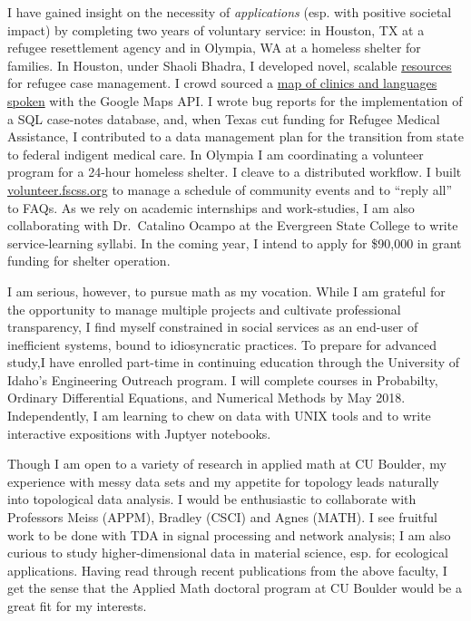 I have gained insight on the necessity of \emph{applications} (esp. with
positive societal impact) by completing two years of voluntary service:
in Houston, TX at a refugee resettlement agency and in Olympia, WA at a
homeless shelter for families. In Houston, under Shaoli Bhadra, I
developed novel, scalable
\href{https://github.com/coltongrainger/ymca-resources}{resources} for
refugee case management. I crowd sourced a
\href{https://drive.google.com/open?id=1kk9yn6-4nifHLIf2tGYbW_7PiYo\&usp=sharing}{map
of clinics and languages spoken} with the Google Maps API. I wrote bug
reports for the implementation of a SQL case-notes database, and, when
Texas cut funding for Refugee Medical Assistance, I contributed to a
data management plan for the transition from state to federal indigent
medical care. In Olympia I am coordinating a volunteer program for a
24-hour homeless shelter. I cleave to a distributed workflow. I built
\href{https://volunteer.fscss.org}{volunteer.fscss.org} to manage a
schedule of community events and to ``reply all'' to FAQs. As we rely on
academic internships and work-studies, I am also collaborating with
Dr.~Catalino Ocampo at the Evergreen State College to write
service-learning syllabi. In the coming year, I intend to apply for
\$90,000 in grant funding for shelter operation.

I am serious, however, to pursue math as my vocation. While I am
grateful for the opportunity to manage multiple projects and cultivate
professional transparency, I find myself constrained in social services
as an end-user of inefficient systems, bound to idiosyncratic practices.
To prepare for advanced study,I have enrolled part-time in continuing
education through the University of Idaho's Engineering Outreach
program. I will complete courses in Probabilty, Ordinary Differential
Equations, and Numerical Methods by May 2018. Independently, I am
learning to chew on data with UNIX tools and to write interactive
expositions with Juptyer notebooks.

Though I am open to a variety of research in applied math at CU Boulder,
my experience with messy data sets and my appetite for topology leads
naturally into topological data analysis. I would be enthusiastic to
collaborate with Professors Meiss (APPM), Bradley (CSCI) and Agnes
(MATH). I see fruitful work to be done with TDA in signal processing and
network analysis; I am also curious to study higher-dimensional data in
material science, esp. for ecological applications. Having read through
recent publications from the above faculty, I get the sense that the
Applied Math doctoral program at CU Boulder would be a great fit for my
interests.
